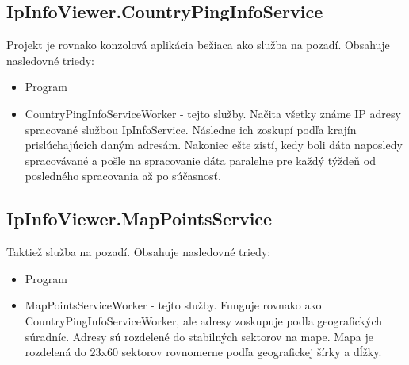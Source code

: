 \subsection{IpInfoViewer.CountryPingInfoService}
Projekt je rovnako konzolová aplikácia bežiaca ako služba na pozadí. Obsahuje nasledovné triedy:
\begin{itemize}
    \item Program
    \item CountryPingInfoServiceWorker
    -  tejto služby.
    Načita všetky známe IP adresy spracované službou IpInfoService. Následne ich zoskupí podľa krajín prislúchajúcich daným adresám. 
    Nakoniec ešte zistí, kedy boli dáta naposledy spracovávané a pošle na spracovanie dáta paralelne pre každý týždeň od posledného spracovania 
    až po súčasnosť.
\end{itemize}
\subsection{IpInfoViewer.MapPointsService}
Taktiež služba na pozadí. Obsahuje nasledovné triedy:
\begin{itemize}
    \item Program
    \item MapPointsServiceWorker
    -  tejto služby.
    Funguje rovnako ako CountryPingInfoServiceWorker, ale adresy zoskupuje podľa geografických súradníc. Adresy sú rozdelené do stabilných sektorov 
    na mape. Mapa je rozdelená do 23x60 sektorov rovnomerne podľa geografickej šírky a dĺžky. 
\end{itemize}
